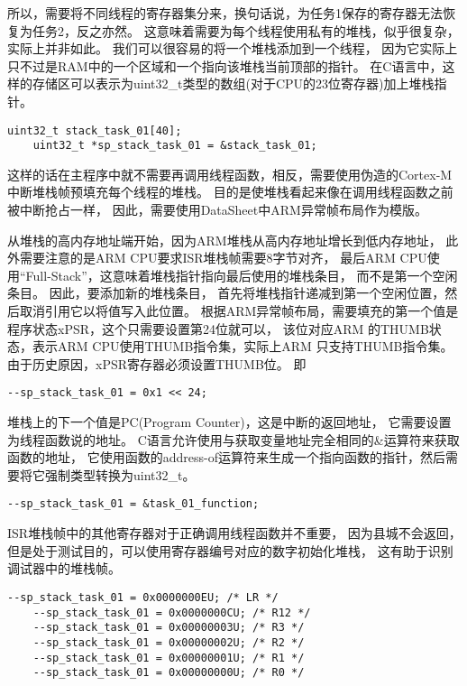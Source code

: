 所以，需要将不同线程的寄存器集分来，换句话说，为任务1保存的寄存器无法恢复为任务2，反之亦然。
这意味着需要为每个线程使用私有的堆栈，似乎很复杂，实际上并非如此。
我们可以很容易的将一个堆栈添加到一个线程，
因为它实际上只不过是RAM中的一个区域和一个指向该堆栈当前顶部的指针。
在C语言中，这样的存储区可以表示为uint32\_t类型的数组(对于CPU的23位寄存器)加上堆栈指针。
\begin{lstlisting}[language={[ANSI]C},keywordstyle=\color{blue!70},commentstyle=\color{red!50!green!50!blue!50},frame=shadowbox, rulesepcolor=\color{red!20!green!20!blue!20}]
    uint32_t stack_task_01[40];
    uint32_t *sp_stack_task_01 = &stack_task_01;
\end{lstlisting}
这样的话在主程序中就不需要再调用线程函数，相反，需要使用伪造的Cortex-M中断堆栈帧预填充每个线程的堆栈。
目的是使堆栈看起来像在调用线程函数之前被中断抢占一样，
因此，需要使用DataSheet中ARM异常帧布局作为模版。

从堆栈的高内存地址端开始，因为ARM堆栈从高内存地址增长到低内存地址，
此外需要注意的是ARM CPU要求ISR堆栈帧需要8字节对齐，
最后ARM CPU使用“Full-Stack”，这意味着堆栈指针指向最后使用的堆栈条目，
而不是第一个空闲条目。
因此，要添加新的堆栈条目，
首先将堆栈指针递减到第一个空闲位置，然后取消引用它以将值写入此位置。
根据ARM异常帧布局，需要填充的第一个值是程序状态xPSR，这个只需要设置第24位就可以，
该位对应ARM 的THUMB状态，表示ARM CPU使用THUMB指令集，实际上ARM 只支持THUMB指令集。
由于历史原因，xPSR寄存器必须设置THUMB位。
即
\begin{lstlisting}[language={[ANSI]C},keywordstyle=\color{blue!70},commentstyle=\color{red!50!green!50!blue!50},frame=shadowbox, rulesepcolor=\color{red!20!green!20!blue!20}]
--sp_stack_task_01 = 0x1 << 24;
\end{lstlisting}
堆栈上的下一个值是PC(Program Counter)，这是中断的返回地址，
它需要设置为线程函数说的地址。
C语言允许使用与获取变量地址完全相同的\&运算符来获取函数的地址，
它使用函数的address-of运算符来生成一个指向函数的指针，然后需要将它强制类型转换为uint32\_t。
\begin{lstlisting}[language={[ANSI]C},keywordstyle=\color{blue!70},commentstyle=\color{red!50!green!50!blue!50},frame=shadowbox, rulesepcolor=\color{red!20!green!20!blue!20}]
    --sp_stack_task_01 = &task_01_function;
 \end{lstlisting}

 ISR堆栈帧中的其他寄存器对于正确调用线程函数并不重要，
 因为县城不会返回，但是处于测试目的，可以使用寄存器编号对应的数字初始化堆栈，
 这有助于识别调试器中的堆栈帧。
 \begin{lstlisting}[language={[ANSI]C},keywordstyle=\color{blue!70},commentstyle=\color{red!50!green!50!blue!50},frame=shadowbox, rulesepcolor=\color{red!20!green!20!blue!20}]
    --sp_stack_task_01 = 0x0000000EU; /* LR */
    --sp_stack_task_01 = 0x0000000CU; /* R12 */
    --sp_stack_task_01 = 0x00000003U; /* R3 */
    --sp_stack_task_01 = 0x00000002U; /* R2 */
    --sp_stack_task_01 = 0x00000001U; /* R1 */
    --sp_stack_task_01 = 0x00000000U; /* R0 */
 \end{lstlisting}

